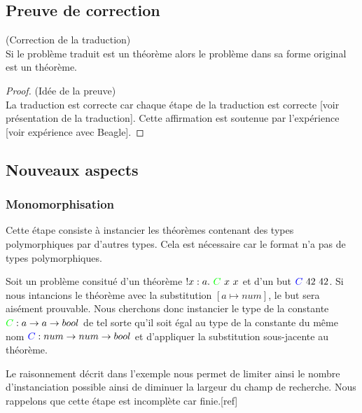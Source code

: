 \subsection{Preuve de correction}

\begin{thm}(Correction de la traduction)
\\Si le problème traduit est un théorème alors le problème dans sa forme original est un théorème.
\end{thm}

\begin{proof}(Idée de la preuve)
\\La traduction est correcte car chaque étape de la traduction est correcte [voir présentation de la traduction]. Cette affirmation est soutenue par l'expérience [voir expérience avec Beagle].
\end{proof}

\subsection{Nouveaux aspects}
\label{sec:traduction:nouveautes}

\subsubsection{Monomorphisation}
Cette étape consiste à instancier les théorèmes contenant des types polymorphiques par d'autres types. Cela est nécessaire car le format \tff n'a pas de types polymorphiques.
  
\begin{example}
Soit un problème consitué d'un théorème $!x:a.\ {\color{green}C}\ x\ x$ et d'un but ${\color{blue}C} \ 42\ 42$. Si nous intancions le théorème avec la substitution $[a \mapsto num]$, le but sera aisément prouvable.
Nous cherchons donc instancier le type de la constante ${\color{green}C} : a \rightarrow a \rightarrow bool$ de tel sorte qu'il soit égal au type de la constante du m\^eme nom ${\color{blue}C} : num \rightarrow num \rightarrow bool$ et d'appliquer la substitution sous-jacente au théorème.
\end{example}
 
\begin{remark}

\end{remark} 
  
Le raisonnement décrit dans l'exemple nous permet de limiter ainsi le nombre d'instanciation possible ainsi de diminuer la largeur du champ de recherche. Nous rappelons que cette étape est incomplète car finie.[ref]


